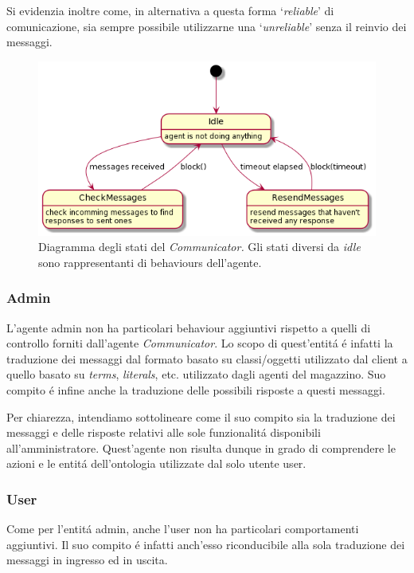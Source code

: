 Si evidenzia inoltre come, in alternativa a questa forma `\textit{reliable}' di comunicazione, sia sempre possibile utilizzarne una `\textit{unreliable}' senza il reinvio dei messaggi.
\begin{figure}[!ht]\centering
    \includegraphics[width=\textwidth]{section/design/figure/agent/communicator_states.png}
    \caption{Diagramma degli stati del \textit{Communicator.} Gli stati diversi da \textit{idle} sono rappresentanti di behaviours dell'agente.}
    \label{fig:communicator_state_diagrams}
\end{figure}

\subsubsection{Admin}
L'agente admin non ha particolari behaviour aggiuntivi rispetto a quelli di controllo forniti dall'agente \textit{Communicator}. Lo scopo di quest'entit\'a \'e infatti la traduzione dei messaggi dal formato basato su classi/oggetti utilizzato dal client a quello basato su \textit{terms}, \textit{literals}, etc. utilizzato dagli agenti del magazzino. Suo compito \'e infine anche la traduzione delle possibili risposte a questi messaggi.

Per chiarezza, intendiamo sottolineare come il suo compito sia la traduzione dei messaggi e delle risposte relativi alle sole funzionalit\'a disponibili all'amministratore. Quest'agente non risulta dunque in grado di comprendere le azioni e le entit\'a dell'ontologia utilizzate dal solo utente user.

\subsubsection{User}
Come per l'entit\'a admin, anche l'user non ha particolari comportamenti aggiuntivi. Il suo compito \'e infatti anch'esso riconducibile alla sola traduzione dei messaggi in ingresso ed in uscita.

